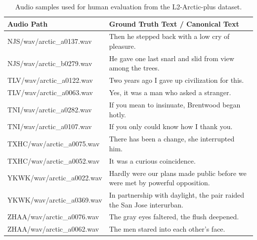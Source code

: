 \documentclass[11pt]{article}
\begin{document}
\begin{table}[h!]
\centering
\small

\begin{tabular}{ll} 
\toprule[1pt]
\textbf{Audio Path} & \textbf{Ground Truth Text / Canonical Text} \\
\midrule
NJS/wav/arctic\_a0137.wav & Then he stepped back with a low cry of pleasure. \\
NJS/wav/arctic\_b0279.wav & He gave one last snarl and slid from view among the trees. \\
\midrule
TLV/wav/arctic\_a0122.wav & Two years ago I gave up civilization for this. \\
TLV/wav/arctic\_a0063.wav & Yes, it was a man who asked a stranger. \\
\midrule
TNI/wav/arctic\_a0282.wav & If you mean to insinuate, Brentwood began hotly. \\
TNI/wav/arctic\_a0107.wav & If you only could know how I thank you. \\
\midrule
TXHC/wav/arctic\_a0075.wav & There has been a change, she interrupted him. \\
TXHC/wav/arctic\_a0052.wav & It was a curious coincidence. \\
\midrule
YKWK/wav/arctic\_a0022.wav & Hardly were our plans made public before we were met by powerful opposition. \\
YKWK/wav/arctic\_a0369.wav & In partnership with daylight, the pair raided the San Jose interurban. \\
\midrule
ZHAA/wav/arctic\_a0076.wav & The gray eyes faltered, the flush deepened. \\
ZHAA/wav/arctic\_a0062.wav & The men stared into each other's face. \\
\bottomrule[1pt]
\end{tabular}
\caption{Audio samples used for human evaluation from the L2-Arctic-plus dataset.}
\label{tab:audio_ground_truth}
\end{table}


\end{document}
